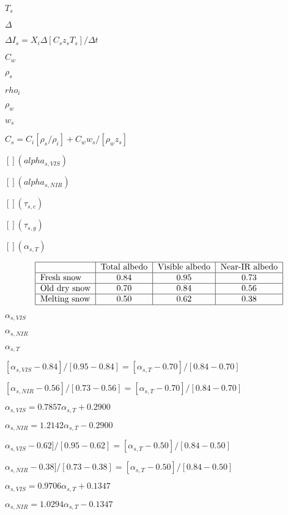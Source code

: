 \documentclass{article}
\begin{document}
{$T_s$
\pagebreak

$\Delta$
\pagebreak

$\Delta I_s = X_i \Delta [C_s z_s T_s] / \Delta t$
\pagebreak

$C_w$
\pagebreak

$\rho_s$
\pagebreak

$rho_i$
\pagebreak

$\rho_w$
\pagebreak

$w_s$
\pagebreak

$C_s = C_i [ \rho_s /\rho_i ] + C_w w_s /[\rho_w z_s]$
\pagebreak

$[ ] (alpha_{s,VIS})$
\pagebreak

$[ ] (alpha_{s,NIR})$
\pagebreak

$[ ] (\tau_{s,c})$
\pagebreak

$[ ] (\tau_{s,g})$
\pagebreak

$[ ] (\alpha_{s,T})$
\pagebreak

\[ \begin{tabular} { | l | c | c | c | } \hline & Total albedo & Visible albedo & Near-IR albedo \\ \hline Fresh snow & 0.84 & 0.95 & 0.73 \\ \hline Old dry snow & 0.70 & 0.84 & 0.56 \\ \hline Melting snow & 0.50 & 0.62 & 0.38 \\ \hline \end{tabular} \]
\pagebreak

$\alpha_{s,VIS}$
\pagebreak

$\alpha_{s,NIR}$
\pagebreak

$\alpha_{s,T}$
\pagebreak

$[\alpha_{s,VIS} - 0.84]/[0.95-0.84] = [\alpha_{s,T} - 0.70]/[0.84-0.70]$
\pagebreak

$[\alpha_{s,NIR} - 0.56]/[0.73-0.56] = [\alpha_{s,T} - 0.70]/[0.84-0.70]$
\pagebreak

$\alpha_{s,VIS} = 0.7857 \alpha_{s,T} + 0.2900$
\pagebreak

$\alpha_{s,NIR} = 1.2142 \alpha_{s,T} - 0.2900$
\pagebreak

$\alpha_{s,VIS} - 0.62]/[0.95-0.62] = [\alpha_{s,T} - 0.50]/[0.84-0.50]$
\pagebreak

$\alpha_{s,NIR} - 0.38]/[0.73-0.38] = [\alpha_{s,T} - 0.50]/[0.84-0.50]$
\pagebreak

$\alpha_{s,VIS} = 0.9706 \alpha_{s,T} + 0.1347$
\pagebreak

$\alpha_{s,NIR} = 1.0294 \alpha_{s,T} - 0.1347$
\pagebreak

}
\end{document}
